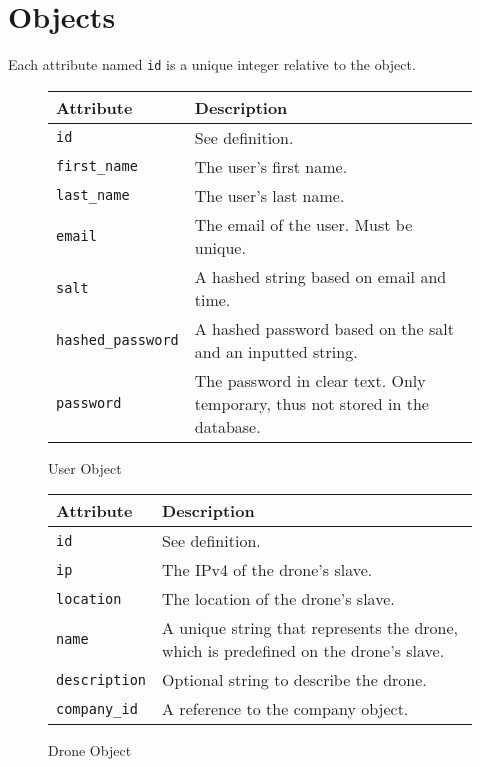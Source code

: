 \chapter{Objects}

Each attribute named \verb+id+ is a unique integer relative to the object.

\begin{figure}[htb]
\begin{center}
\begin{tabular}{ | l | p{8cm} | }
  \hline
    \textbf{Attribute} & \textbf{Description} \\ \hline
    \verb+id+ & See definition.\\ \hline
    \verb+first_name+ & The user's first name.\\ \hline
    \verb+last_name+ & The user's last name.\\ \hline
    \verb+email+ & The email of the user. Must be unique.\\ \hline
    \verb+salt+ & A hashed string based on email and time.\\ \hline
    \verb+hashed_password+ & A hashed password based on the salt and an inputted string.\\ \hline
    \verb+password+ & The password in clear text. Only temporary, thus not stored in the database.\\ \hline
\end{tabular}
\caption{User Object}
\label{tab:user_object}
\end{center}
\end{figure}

\begin{figure}[htb]
\begin{center}
\begin{tabular}{ | l | p{8cm} | }
  \hline
    \textbf{Attribute} & \textbf{Description} \\ \hline
    \verb+id+ & See definition.\\ \hline
    \verb+ip+ & The IPv4 of the drone's slave.\\ \hline
    \verb+location+ & The location of the drone's slave.\\ \hline
    \verb+name+ & A unique string that represents the drone, which is predefined on the drone's slave.\\ \hline
    \verb+description+ & Optional string to describe the drone.\\ \hline
    \verb+company_id+ & A reference to the company object.\\ \hline
\end{tabular}
\caption{Drone Object}
\label{tab:drone_object}
\end{center}
\end{figure}

